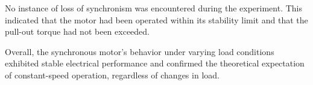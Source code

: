 \documentclass[a4paper,12pt]{article}
\begin{document}
No instance of loss of synchronism was encountered during the experiment. This indicated that the motor had been operated within its stability limit and that the pull-out torque had not been exceeded. 

Overall, the synchronous motor’s behavior under varying load conditions exhibited stable electrical performance and confirmed the theoretical expectation of constant-speed operation, regardless of changes in load.

	
	
\end{document}
